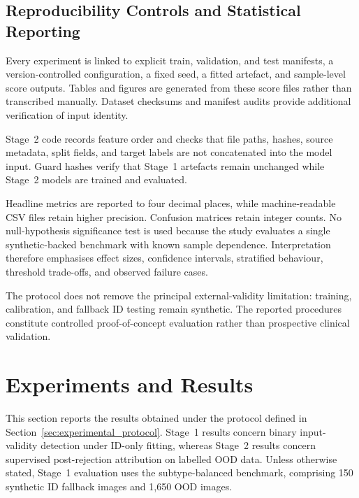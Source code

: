 \documentclass[fleqn,12pt]{olplainarticle}
\begin{document}
\subsection{Reproducibility Controls and Statistical Reporting}
\label{subsec:protocol_reproducibility}

Every experiment is linked to explicit train, validation, and test manifests,
a version-controlled configuration, a fixed seed, a fitted artefact, and
sample-level score outputs. Tables and figures are generated from these score
files rather than transcribed manually. Dataset checksums and manifest audits
provide additional verification of input identity.

Stage~2 code records feature order and checks that file paths, hashes, source
metadata, split fields, and target labels are not concatenated into the model
input. Guard hashes verify that Stage~1 artefacts remain unchanged while
Stage~2 models are trained and evaluated.

Headline metrics are reported to four decimal places, while machine-readable
CSV files retain higher precision. Confusion matrices retain integer counts.
No null-hypothesis significance test is used because the study evaluates a
single synthetic-backed benchmark with known sample dependence.
Interpretation therefore emphasises effect sizes, confidence intervals,
stratified behaviour, threshold trade-offs, and observed failure cases.

The protocol does not remove the principal external-validity limitation:
training, calibration, and fallback ID testing remain synthetic. The reported
procedures constitute controlled proof-of-concept evaluation rather than
prospective clinical validation.

\newpage

\section{Experiments and Results}
\label{sec:results}

\begingroup
\setlength{\textfloatsep}{9pt plus 2pt minus 2pt}
\setlength{\floatsep}{8pt plus 2pt minus 2pt}
\setlength{\intextsep}{8pt plus 2pt minus 2pt}
\captionsetup{font=footnotesize,skip=4pt}

This section reports the results obtained under the protocol defined in
Section~\ref{sec:experimental_protocol}. Stage~1 results concern binary
input-validity detection under ID-only fitting, whereas Stage~2 results
concern supervised post-rejection attribution on labelled OOD data. Unless
otherwise stated, Stage~1 evaluation uses the subtype-balanced benchmark,
comprising 150 synthetic ID fallback images and 1,650 OOD images.
\end{document}
